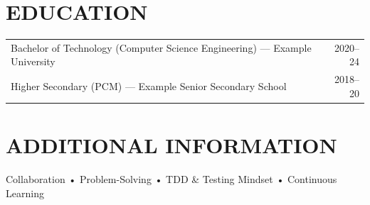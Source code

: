 \documentclass[a4paper,11pt]{article}
\begin{document}
\section*{EDUCATION}
\begin{tabularx}{\textwidth}{@{}Xr@{}}
Bachelor of Technology (Computer Science Engineering) — Example University & 2020–24 \\
Higher Secondary (PCM) — Example Senior Secondary School & 2018–20 \\
\end{tabularx}

\section*{ADDITIONAL INFORMATION}
Collaboration • Problem-Solving • TDD \& Testing Mindset • Continuous Learning
\end{document}

